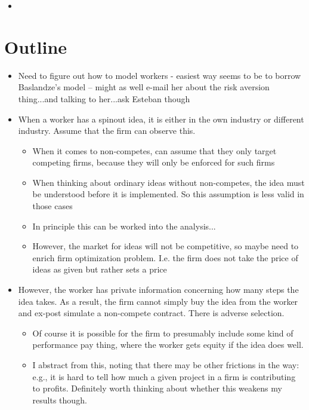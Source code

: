 \documentclass[12pt,english]{article}
\theoremstyle{remark}
\begin{document}
\begin{itemize}
	\item 
\end{itemize}
















 

\section{Outline}

\begin{itemize}
	\item Need to figure out how to model workers - easiest way seems to be to borrow Baslandze's model -- might as well e-mail her about the risk aversion thing...and talking to her...ask Esteban though
	\item When a worker has a spinout idea, it is either in the own industry or different industry. Assume that the firm can observe this.
	\begin{itemize}
		\item When it comes to non-competes, can assume that they only target competing firms, because they will only be enforced for such firms
		\item When thinking about ordinary ideas without non-competes, the idea must be understood before it is implemented. So this assumption is less valid in those cases
		\item In principle this can be worked into the analysis...
		\item However, the market for ideas will not be competitive, so maybe need to enrich firm optimization problem. I.e. the firm does not take the price of ideas as given but rather sets a price
	\end{itemize} 
	\item However, the worker has private information concerning how many steps the idea takes. As a result, the firm cannot simply buy the idea from the worker and ex-post simulate a non-compete contract. There is adverse selection.
	\begin{itemize}
		\item Of course it is possible for the firm to presumably include some kind of performance pay thing, where the worker gets equity if the idea does well.
		\item I abstract from this, noting that there may be other frictions in the way: e.g., it is hard to tell how much a given project in a firm is contributing to profits. Definitely worth thinking about whether this weakens my results though.

\end{itemize}
\end{itemize}
\end{document}
